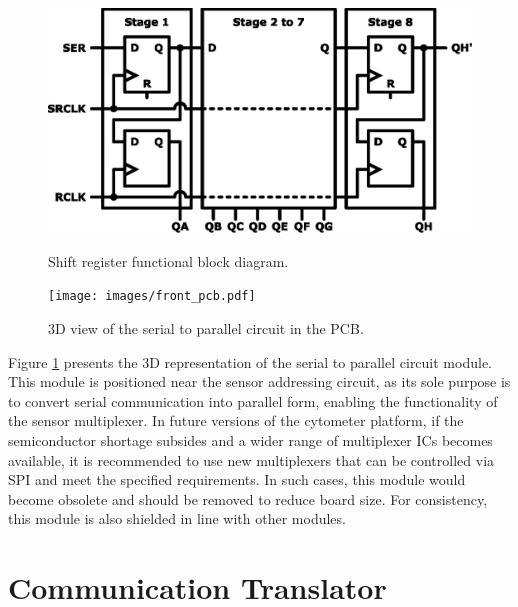 \begin{figure}[!ht]
    \centering
    \begin{minipage}{0.475\textwidth}
        \centering
        \includegraphics[width=\textwidth]{images/chapter_4/sensor_addressing/shiftregister.eps}
        \caption{Shift register functional block diagram.}
        \label{figure:shiftregister}
    \end{minipage}\hfill
    \begin{minipage}{0.475\textwidth}
        \centering
        \texttt{[image: images/front\_pcb.pdf]}
        \caption{3D view of the serial to parallel circuit in the PCB.}
        \label{figure:s2p-pcb}
    \end{minipage}
\end{figure}

Figure \ref{figure:s2p-pcb} presents the \ac{3D} representation of the serial to parallel circuit module. This module is positioned near the sensor addressing circuit, as its sole purpose is to convert serial communication into parallel form, enabling the functionality of the sensor multiplexer. In future versions of the cytometer platform, if the semiconductor shortage subsides and a wider range of multiplexer \ac{IC}s becomes available, it is recommended to use new multiplexers that can be controlled via \ac{SPI} and meet the specified requirements. In such cases, this module would become obsolete and should be removed to reduce board size. For consistency, this module is also shielded in line with other modules.

\section{Communication Translator}
\label{chapter:fe-comms}

